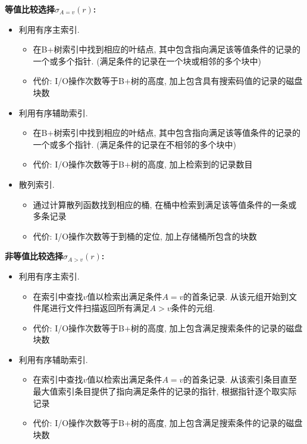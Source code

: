 \textbf{等值比较选择$\sigma_{A=v}(r)$:}
\begin{itemize}
    \item 利用有序主索引.
    \begin{itemize}
        \item 在B+树索引中找到相应的叶结点, 其中包含指向满足该等值条件的记录的一个或多个指针. (满足条件的记录在一个块或相邻的多个块中)
        \item 代价: I/O操作次数等于B+树的高度, 加上包含具有搜索码值的记录的磁盘块数
    \end{itemize}
    \item 利用有序辅助索引.
    \begin{itemize}
        \item 在B+树索引中找到相应的叶结点, 其中包含指向满足该等值条件的记录的一个或多个指针. (满足条件的记录在不相邻的多个块中)
        \item 代价: I/O操作次数等于B+树的高度, 加上检索到的记录数目
    \end{itemize}
    \item 散列索引.
    \begin{itemize}
        \item 通过计算散列函数找到相应的桶, 在桶中检索到满足该等值条件的一条或多条记录
        \item 代价: I/O操作次数等于到桶的定位, 加上存储桶所包含的块数
    \end{itemize}
\end{itemize}

\textbf{非等值比较选择$\sigma_{A>v}(r)$:}
\begin{itemize}
    \item 利用有序主索引.
    \begin{itemize}
        \item 在索引中查找$v$值以检索出满足条件$A=v$的首条记录. 从该元组开始到文件尾进行文件扫描返回所有满足$A>v$条件的元组.
        \item 代价: I/O操作次数等于B+树的高度, 加上包含满足搜索条件的记录的磁盘块数
    \end{itemize}
    \item 利用有序辅助索引.
    \begin{itemize}
        \item 在索引中查找$v$值以检索出满足条件$A=v$的首条记录. 从该索引条目直至最大值索引条目提供了指向满足条件的记录的指针, 根据指针逐个取实际记录
        \item 代价: I/O操作次数等于B+树的高度, 加上包含满足搜索条件的记录的磁盘块数
    \end{itemize}
\end{itemize}

